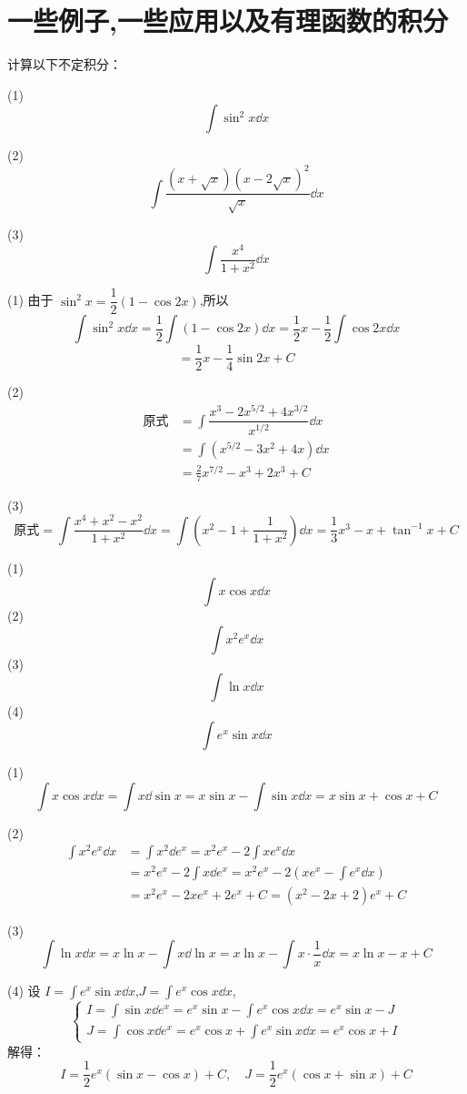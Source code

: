 \section{一些例子,一些应用以及有理函数的积分}
\begin{problem}
	计算以下不定积分：
	
	(1) $$\int \sin^2 x \dd x$$
	
	(2)$$\int \frac{(x+\sqrt{x})(x-2\sqrt{x})^2}{\sqrt{x}} \dd x$$
	
	(3) $$\int \frac{x^4}{1+x^2} \dd x$$
\end{problem}
\begin{solution}
	(1) 由于 $\sin^2 x = \dfrac{1}{2}(1 - \cos 2x)$,所以
	\[
	\int \sin^2 x \dd x = \frac{1}{2} \int (1 - \cos 2x) \dd x = \frac{1}{2} x - \frac{1}{2} \int \cos 2x \dd x
	\]
	\[
	= \frac{1}{2} x - \frac{1}{4} \sin 2x + C
	\]
	
	(2) \[\begin{aligned}
		\text{原式} &= \int \dfrac{x^3 - 2x^{5/2} + 4x^{3/2}}{x^{1/2}} \dd x\\& = \int (x^{5/2} - 3x^2 + 4x) \dd x\\
		&= \frac{2}{7} x^{7/2} -  x^3 + 2 x^3 + C
	\end{aligned}\]
	
	
	(3)\[\text{原式}= \int \frac{x^4 + x^2 - x^2}{1 + x^2} \dd x = \int \left(x^2 - 1 + \frac{1}{1+x^2}\right) \dd x= \frac{1}{3} x^3 - x + \tan^{-1} x + C\]  
\end{solution}
\begin{problem}
	(1)\[\int x\cos x\dd x\]
	(2)\[\int x^2e^x\dd x\]
	(3)\[\int\ln x\dd x\]
	(4)\[\int e^x\sin x\dd x\]
\end{problem}
\begin{solution}
	(1) $$\int x \cos x \dd x = \int x \dd\sin x = x \sin x - \int \sin x \dd x = x \sin x + \cos x + C$$
	
	(2)\[\begin{aligned}
		\int x^2 e^x \dd x &= \int x^2 \dd e^x = x^2 e^x - 2 \int x e^x \dd x\\&= x^2 e^x - 2 \int x \dd e^x = x^2 e^x - 2(x e^x - \int e^x \dd x) \\&= x^2 e^x - 2x e^x + 2 e^x + C = (x^2 - 2x + 2)e^x + C
	\end{aligned}\] 
	
	(3) $$\int \ln x \dd x = x \ln x - \int x \dd\ln x = x \ln x - \int x \cdot \frac{1}{x} \dd x = x \ln x - x + C$$
	
	(4) 设 $I = \displaystyle\int e^x \sin x \dd x$,$J = \displaystyle\int e^x \cos x \dd x$,
	\[
	\begin{cases}
		I = \displaystyle\int \sin x \dd e^x = e^x \sin x - \displaystyle\int e^x \cos x \dd x = e^x \sin x - J \\
		J = \displaystyle\int \cos x \dd e^x = e^x \cos x + \displaystyle\int e^x \sin x \dd x = e^x \cos x + I
	\end{cases}
	\]
	解得：
	\[
	I = \frac{1}{2} e^x (\sin x - \cos x) + C, \quad J = \frac{1}{2} e^x (\cos x + \sin x) + C
	\]
\end{solution}
